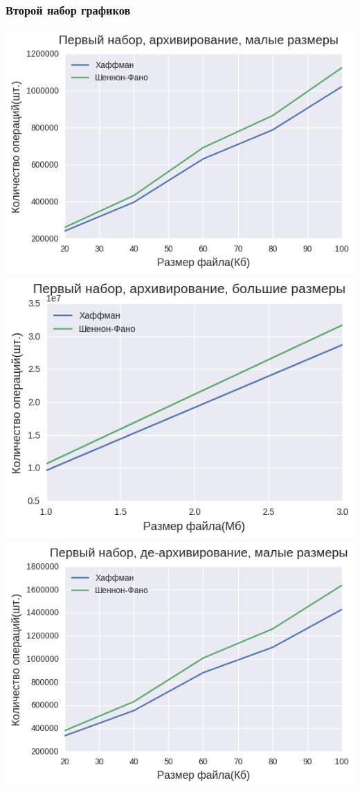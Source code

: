 \documentclass[russian, a4paper, 12pt]{article}
\begin{document}
\subsubsection{Второй набор графиков}
\begin{center}
\includegraphics[width=0.9\linewidth]{./plots/2/2_1_1_1.png}\\
\includegraphics[width=0.9\linewidth]{./plots/2/2_1_1_2.png}\\
\includegraphics[width=0.9\linewidth]{./plots/2/2_1_2_1.png}\\

\end{center}
\end{document}
